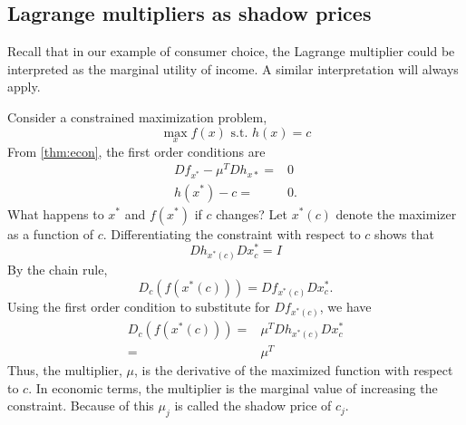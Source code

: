 \subsection{Lagrange multipliers as shadow prices}

Recall that in our example of consumer choice, the Lagrange multiplier
could be interpreted as the marginal utility of income.  A similar
interpretation will always apply. 

Consider a constrained maximization problem,
\[ \max_{x} f(x) \text{ s.t. } h(x) = c \]
From \ref{thm:econ}, the first order conditions are
\begin{align*}
 Df_{x^*} - \mu^T Dh_{x*} = & 0 \\
 h(x^*) - c = & 0.
\end{align*}
What happens to $x^*$ and $f(x^*)$ if $c$ changes? Let $x^*(c)$ denote
the maximizer as a function of $c$. Differentiating the constraint
with respect to $c$ shows that
\[ Dh_{x^*(c)} Dx^*_c = I \]
By the chain rule,
\[ D_c \left( f(x^*(c)) \right) = Df_{x^*(c)} Dx^*_c. \] 
Using the first order condition to substitute for $Df_{x^*(c)}$, we
have
\begin{align*}
  D_c \left( f(x^*(c)) \right) = & \mu^T Dh_{x^*(c)} Dx^*_c \\
  = & \mu^T 
\end{align*}
Thus, the multiplier, $\mu$, is the derivative of the maximized
function with respect to $c$.  In economic terms, the multiplier is
the marginal value of increasing the constraint. Because of this
$\mu_j$ is called the shadow price of $c_j$. 

